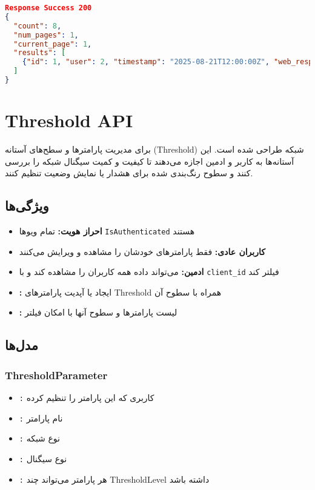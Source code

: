 \documentclass{report}
\begin{document}
\begin{lstlisting}[language=json]
Response Success 200
{
  "count": 8,
  "num_pages": 1,
  "current_page": 1,
  "results": [
    {"id": 1, "user": 2, "timestamp": "2025-08-21T12:00:00Z", "web_response_time": 120.5}
  ]
}
\end{lstlisting}



\section{Threshold API}
برای مدیریت پارامترها و سطح‌های آستانه (Threshold) شبکه طراحی شده است. این آستانه‌ها به کاربر و ادمین اجازه می‌دهند تا کیفیت و کمیت سیگنال شبکه  را بررسی کنند و سطوح رنگ‌بندی شده برای هشدار یا نمایش وضعیت تنظیم کنند.

\subsection{ویژگی‌ها}
\begin{itemize}
    \item \textbf{احراز هویت:} تمام ویوها \texttt{IsAuthenticated} هستند
    \item \textbf{کاربران عادی:} فقط پارامترهای خودشان را مشاهده و ویرایش می‌کنند
    \item \textbf{ادمین:} می‌تواند داده همه کاربران را مشاهده کند و با \texttt{client\_id} فیلتر کند
    \item \textbf{:} ایجاد یا آپدیت پارامترهای Threshold همراه با سطوح آن
    \item \textbf{:} لیست پارامترها و سطوح آنها با امکان فیلتر
\end{itemize}

\subsection{مدل‌ها}
\subsubsection{ThresholdParameter}
\begin{itemize}
    \item \texttt{:} کاربری که این پارامتر را تنظیم کرده
    \item \texttt{:} نام پارامتر 
    \item \texttt{:} نوع شبکه 
    \item \texttt{:} نوع سیگنال 
    \item \texttt{:} هر پارامتر می‌تواند چند ThresholdLevel داشته باشد
\end{itemize}
\end{document}
